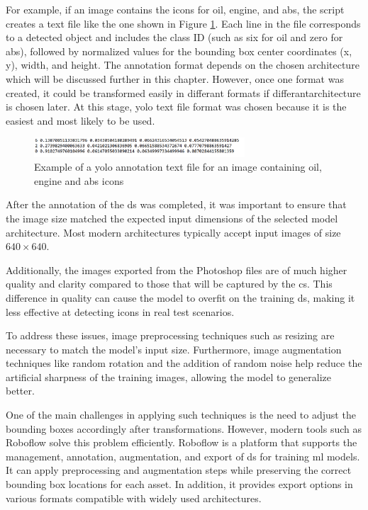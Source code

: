 For example, if an image contains the icons for oil, engine, and \gls{abs}, the script creates a text file like the one shown in Figure \ref{oil_engine_abs_txt}. Each line in the file corresponds to a detected object and includes the class ID (such as six for oil and zero for \gls{abs}), followed by normalized values for the bounding box center coordinates (x, y), width, and height. The annotation format depends on the chosen architecture which will be discussed further in this chapter. However, once one format was created, it could be transformed easily in differant formats if differantarchitecture is chosen later. At this stage, \gls{yolo} text file format was chosen because it is the easiest and most likely to be used.


\begin{figure}[!h]
    \centering
    \includegraphics[width=0.7\textwidth]{Figures/Oil_Engine_ABS.png}
    \caption{Example of a \gls{yolo} annotation text file for an image containing oil, engine and \gls{abs} icons}
    \label{oil_engine_abs_txt}
\end{figure}

After the annotation of the \gls{ds} was completed, it was important to ensure that the image size matched the expected input dimensions of the selected model architecture. Most modern architectures typically accept input images of size $640 \times 640$.

Additionally, the images exported from the Photoshop files are of much higher quality and clarity compared to those that will be captured by the \gls{cs}. This difference in quality can cause the model to overfit on the training \gls{ds}, making it less effective at detecting icons in real test scenarios.

To address these issues, image preprocessing techniques such as resizing are necessary to match the model’s input size. Furthermore, image augmentation techniques like random rotation and the addition of random noise help reduce the artificial sharpness of the training images, allowing the model to generalize better.

One of the main challenges in applying such techniques is the need to adjust the bounding boxes accordingly after transformations. However, modern tools such as Roboflow solve this problem efficiently. Roboflow is a platform that supports the management, annotation, augmentation, and export of \gls{ds} for training \gls{ml} models. It can apply preprocessing and augmentation steps while preserving the correct bounding box locations for each asset. In addition, it provides export options in various formats compatible with widely used architectures.

